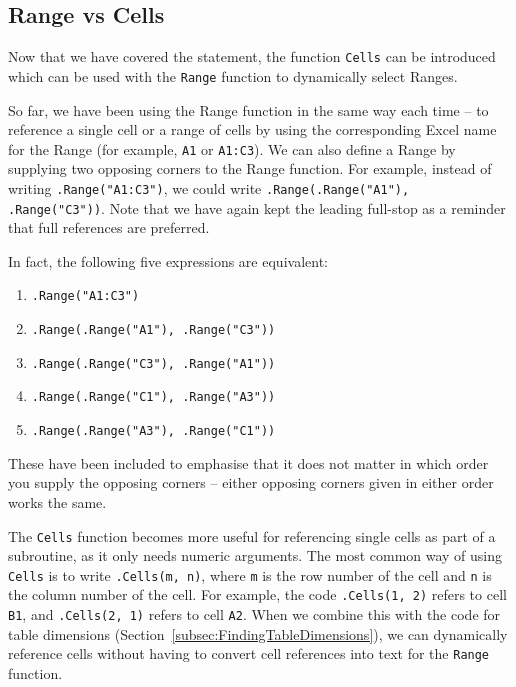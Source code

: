 \documentclass[11pt]{article}%
\begin{document}

\subsection{Range vs Cells}\label{subsec:RangeVsCells}

Now that we have covered the  statement, the function \texttt{Cells} can be introduced which can be used with the \texttt{Range} function to dynamically select Ranges.

So far, we have been using the Range function in the same way each time -- to reference a single cell or a range of cells by using the corresponding Excel name for the Range (for example, \texttt{A1} or \texttt{A1:C3}). We can also define a Range by supplying two opposing corners to the Range function. For example, instead of writing \texttt{.Range("A1:C3")}, we could write \texttt{.Range(.Range("A1"), .Range("C3"))}. Note that we have again kept the leading full-stop as a reminder that full references are preferred.

In fact, the following five expressions are equivalent:

\begin{enumerate}
    \item \texttt{.Range("A1:C3")}
    \item \texttt{.Range(.Range("A1"), .Range("C3"))}
    \item \texttt{.Range(.Range("C3"), .Range("A1"))}
    \item \texttt{.Range(.Range("C1"), .Range("A3"))}
    \item \texttt{.Range(.Range("A3"), .Range("C1"))}
\end{enumerate}

These have been included to emphasise that it does not matter in which order you supply the opposing corners -- either opposing corners given in either order works the same.

The \texttt{Cells} function becomes more useful for referencing single cells as part of a subroutine, as it only needs numeric arguments. The most common way of using \texttt{Cells} is to write \texttt{.Cells(m, n)}, where \texttt{m} is the row number of the cell and \texttt{n} is the column number of the cell. For example, the code \texttt{.Cells(1, 2)} refers to cell \texttt{B1}, and \texttt{.Cells(2, 1)} refers to cell \texttt{A2}. When we combine this with the code for table dimensions (Section~\ref{subsec:FindingTableDimensions}), we can dynamically reference cells without having to convert cell references into text for the \texttt{Range} function.
\end{document}
